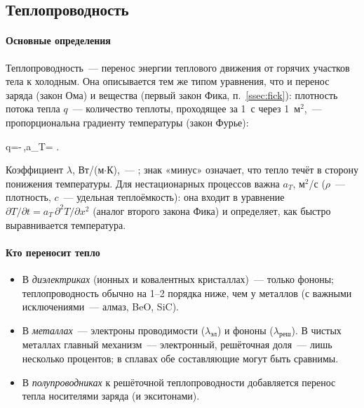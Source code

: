 \subsection{Теплопроводность}\label{ssec:thermal-cond}

\paragraph{Основные определения}
Теплопроводность~— перенос энергии теплового движения от горячих
участков тела к холодным. Она описывается тем же типом уравнения, что и
перенос заряда (закон Ома) и вещества (первый закон Фика,
п.~\ref{ssec:fick}): плотность потока тепла $q$~— количество теплоты,
проходящее за 1~с через 1~м$^2$,~— пропорциональна градиенту температуры
(закон Фурье):
\begin{keyeq}\label{eq:fourier}
q=-\lambda\,,\qquad a_T= .
\end{keyeq}
Коэффициент $\lambda$, Вт/(м$\cdot$К),~— ; знак
«минус» означает, что тепло течёт в сторону понижения температуры. Для
нестационарных процессов важна  $a_T$, м$^2$/с
($\rho$~— плотность, $c$~— удельная теплоёмкость): она входит в уравнение
$\partial T/\partial t=a_T\,\partial^2T/\partial x^2$ (аналог второго закона
Фика) и определяет, как быстро выравнивается температура.

\paragraph{Кто переносит тепло}
\begin{itemize}
\item В \emph{диэлектриках} (ионных и ковалентных кристаллах)~— только
фононы; теплопроводность обычно на 1--2 порядка ниже, чем у металлов
(с важными исключениями~— алмаз, BeO, SiC).
\item В \emph{металлах}~— электроны проводимости ($\lambda_\text{эл}$) и
фононы ($\lambda_\text{реш}$). В чистых металлах главный механизм~—
электронный, решёточная доля~— лишь несколько процентов; в сплавах обе
составляющие могут быть сравнимы.
\item В \emph{полупроводниках} к решёточной теплопроводности добавляется
перенос тепла носителями заряда (и экситонами).
\end{itemize}

